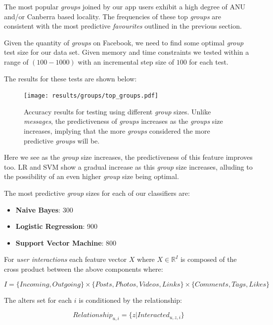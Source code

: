 \clearpage

The most popular \emph{groups} joined by our app users exhibit a high degree of ANU and/or Canberra based locality. The 
frequencies of these top \emph{groups} are consistent with the most predictive \emph{favourites} outlined in the previous section.

Given the quantity of \emph{groups} on Facebook, we need to find some optimal \emph{group} test size for our data set. 
Given memory and time constraints we tested within a range of $(100-1000)$ with an incremental step size of $100$ for each test.

The results for these tests are shown below:

\begin{figure}[h]
	\begin{center}
		\texttt{[image: results/groups/top\_groups.pdf]}
		\caption{Accuracy results for testing using different \emph{group} sizes. Unlike \emph{messages},
				 the predictiveness of \emph{groups} increases as the \emph{groups} size increases, implying that the more \emph{groups} considered the more 
				 predictive \emph{groups} will be.}
	\end{center}
\end{figure}

Here we see as the \emph{group} size increases, the predictiveness of this feature improves too. LR and SVM show a gradual increase 
as this \emph{group} size increases, alluding to the possibility of an even higher \emph{group} size being optimal.

The most predictive \emph{group} sizes for each of our classifiers are:
\begin{itemize}
\item \textbf{Naive Bayes}: 300
\item \textbf{Logistic Regression}: 900
\item \textbf{Support Vector Machine}: 800
\end{itemize}




For \emph{user interactions} each feature vector $X$ where $X \in \mathbb{R}^I$ is composed of the cross product between the above components where:

\[ I = \{Incoming, Outgoing\} \times \{Posts,Photos,Videos,Links\} \times \{Comments,Tags,Likes\} \]

The alters set for each $i$ is conditioned by the relationship:

\[ Relationship_{u,i} = \{z | Interacted_{u,z,i}\} \]

